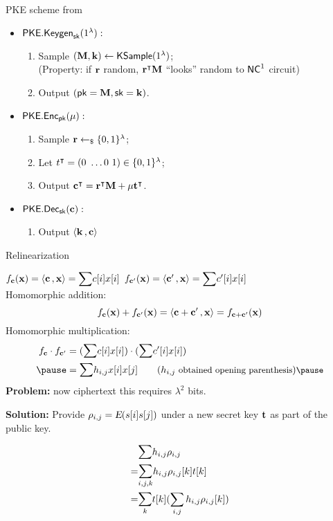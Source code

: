 \begin{frame}{PKE scheme from \cite{fgcrypto}}
	\begin{itemize}
		\item $\mathsf{PKE.Keygen}_{\mathsf{sk}}(1^{\lambda}):$
		\begin{enumerate}
			\item Sample $(\mathbf{M}, \mathbf{k}) \gets \mathsf{KSample}(1^{\lambda})$;\\
			 {\color{red}(Property: if $\mathbf{r}$ random, ${\mathbf{r}}^{\intercal}  \mathbf{M}$ ``looks'' random to ${\mathsf{NC}}^1$ circuit)}
			\item Output $(\mathsf{pk} = \mathbf{M}, \mathsf{sk} = \mathbf{k})$.
		\end{enumerate}
		\item $\mathsf{PKE.Enc}_{\mathsf{pk}}(\mu):$
		\begin{enumerate}
			\item Sample $\mathbf{r} \leftarrow_{\$} \{0, 1\}^{\lambda}$;
			\item Let ${t}^{\intercal} = (0 \ \dots 0 \ 1) \in \{0, 1\}^{\lambda}$;
			\item Output $\transp{\c} = \transp{\r}  \M + \mu\transp{\t}$.
		\end{enumerate}
		\item $\PKEDec_{\sk}(\c):$
		\begin{enumerate}
			\item Output $\inprod{\k}{\c}$
		\end{enumerate}
		
	\end{itemize}
\end{frame}

\def\c{\vect{c}}
\def\cp{\vect{c'}}
\def\fc{f_{\c}}
\def\fcp{f_{\cp}}
\def\x{\vect{x}}

\begin{frame}{Relinearization \cite{fhe-lwe}}

 $  \fc(\x) = \inprod{\c}{\vect{x}} = \Sum c[i] x[i]$ \quad\quad\quad
 $  \fcp(\x) = \inprod{\cp}{\vect{x}} = \Sum c'[i] x[i]$
  \pause\\
 \medskip
 Homomorphic addition:
$$ \fc(\x)+\fcp(\x) = \inprod{\c+\cp}{\vect{x}}  = f_{\c+\cp}(\x) $$ 
\medskip 
\pause
Homomorphic multiplication:
 \begin{align*}
 \fc\cdot\fcp  & =   (\Sum c[i] x[i]) \cdot (\Sum c'[i]x[i]) \\\pause
        				 & =  \Sum h_{i,j} x[i]x[j]   \quad\quad \small{( h_{i,j} \text{ obtained opening parenthesis})}\pause
\end{align*}
\textbf{Problem:} now ciphertext this requires $\lambda^2$ bits.\pause

\textbf{Solution:} Provide $\mathbf{\rho}_{i,j} = {\textsl{E}}(s[i]s[j])$ under a new secret key $\mathbf{t}$ as part of the public key.
 
 \begin{align*}
&  \Sum h_{i,j} \vect{\rho}_{i,j} \\ %
= & \Sum_{i,j,k} h_{i,j} \rho_{i,j}[k] t[k]\\ = & \Sum_k t[k](\sum_{i,j} h_{i,j} \rho_{i,j}[k])
 \end{align*}
 
\end{frame}